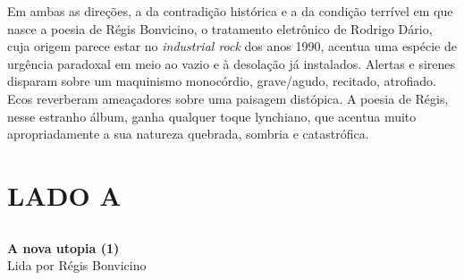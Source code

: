 Em ambas as direções, a da contradição histórica e a da condição
terrível em que nasce a poesia de Régis Bonvicino, o tratamento
eletrônico de Rodrigo Dário, cuja origem parece estar no
\emph{industrial rock} dos anos 1990, acentua uma espécie de urgência
paradoxal em meio ao vazio e à desolação já instalados. Alertas e
sirenes disparam sobre um maquinismo monocórdio, grave/agudo, recitado,
atrofiado. Ecos reverberam ameaçadores sobre uma paisagem distópica. A
poesia de Régis, nesse estranho álbum, ganha qualquer toque lynchiano,
que acentua muito apropriadamente a sua natureza quebrada, sombria e
catastrófica.

\part{LADO A}

\chapter*{}
\textbf{A nova utopia (1)}\\
Lida por Régis Bonvicino

\bigskip

